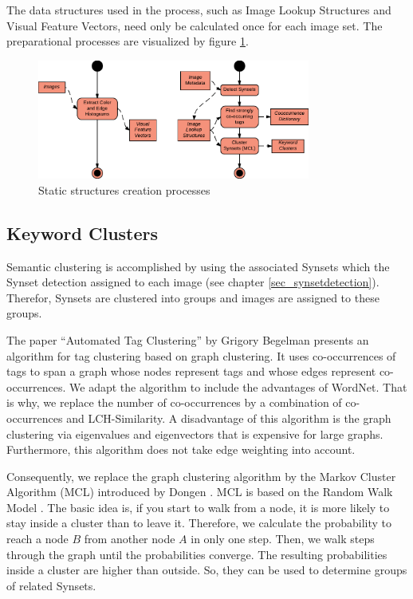 The data structures used in the process, such as Image Lookup Structures and Visual Feature Vectors, need only be calculated once for each image set. The preparational processes are visualized by figure \ref{fig_precalcprocess}.

\begin{figure}[h]
\centering
\includegraphics[width=0.8\textwidth]{images/precalcs_activity_diagram.pdf}
\caption{Static structures creation processes}
\label{fig_precalcprocess}
\end{figure}


\subsection{Keyword Clusters}
\label{sec_keywordclustering}
Semantic clustering is accomplished by using the associated Synsets which the Synset detection assigned to each image (see chapter \ref{sec_synsetdetection}). Therefor, Synsets are clustered into groups and images are assigned to these groups.

\bigskip
The paper ``Automated Tag Clustering'' by Grigory Begelman \cite{begelman2006automated} presents an algorithm for tag clustering based on graph clustering. It uses co-occurrences of tags to span a graph whose nodes represent tags and whose edges represent co-occurrences. We adapt the algorithm to include the advantages of WordNet. That is why, we replace the number of co-occurrences by a combination of co-occurrences and LCH-Similarity.
A disadvantage of this algorithm is the graph clustering via eigenvalues and eigenvectors that is expensive for large graphs. Furthermore, this algorithm does not take edge weighting into account.

Consequently, we replace the graph clustering algorithm by the Markov Cluster Algorithm (MCL) introduced by Dongen \cite{Dongen1998}. MCL is based on the Random Walk Model \cite{spitzer2001principles}. The basic idea is, if you start to walk from a node, it is more likely to stay inside a cluster than to leave it. Therefore, we calculate the probability to reach a node $B$ from another node $A$ in only one step. Then, we walk steps through the graph until the probabilities converge. The resulting probabilities inside a cluster are higher than outside. So, they can be used to determine groups of related Synsets.

